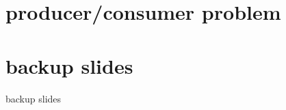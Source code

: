

\section{producer/consumer problem}






\section{backup slides}
\begin{frame}{backup slides}
\end{frame}




